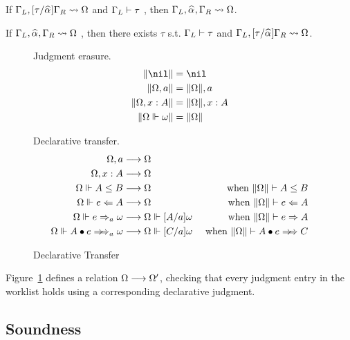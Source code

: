 \begin{lemma}[Insert]\label{lem:top:insert}
If $\Gm_L, [\tau/\al]\Gm_R \sto \Om$ and $\Gamma_L\vdash \tau$
, then $\Gm_L, \al, \Gm_R \sto \Om$.
\end{lemma}
\begin{lemma}[Extract]\label{lem:top:extract}
If $\Gm_L, \al, \Gm_R \sto \Om$
, then there exists $\tau$ s.t. $\Gamma_L\vdash\tau$ and $\Gm_L, [\tau/\al]\Gm_R \sto \Om$.
\end{lemma}

\begin{figure}[ht]
\hfill \framebox{$\|\Om\|$} \hfill Judgment erasure.
\begin{gather*}
\begin{aligned}
\|\nil\| &= \nil\\
\|\Om,a\| &= \|\Om\|, a\\
\|\Om,x:A\| &= \|\Om\|, x:A\\
\|\Om\Vdash\jg\| &= \|\Om\|
\end{aligned}
\end{gather*}

\hfill {} \hfill Declarative transfer.
\begin{gather*}
\begin{aligned}
\Om,a &\rto \Om \\  \Om,x:A & \rto \Om\\
\Om\Vdash A\le B &\rto \Om &\text{ when } \|\Om\| \vdash A\le B\\
\Om\Vdash e\Lto A &\rto \Om & \text{ when } \|\Om\| \vdash e\Lto A\\
\Om\Vdash e\To_a \jg &\rto \Om\Vdash[A/a]\jg & \text{ when } \|\Om\| \vdash e\To A\\
\Om\Vdash \appInfAlg{A}{e} &\rto \Om\Vdash[C/a]\jg & \text{ when } \|\Om\| \vdash \appInf{A}{e}{C}\\
\end{aligned}
\end{gather*}
\caption{Declarative Transfer}
\label{fig:top:decl:worklist}
\end{figure}

Figure~\ref{fig:top:decl:worklist} defines a relation $\Omega \longrightarrow \Omega'$,
checking that every judgment entry in the worklist
holds using a corresponding declarative judgment.

\subsection{Soundness}

